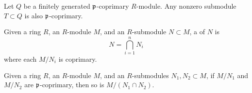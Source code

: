 \documentclass{ximera}
\begin{document}
\begin{lemma}
  Let $Q$ be a finitely generated $\mathfrak{p}$-coprimary $R$-module. Any
  nonzero submodule $T\subset Q$ is also $\mathfrak{p}$-coprimary.
  \begin{sketch}
  \end{sketch}
\end{lemma}




\begin{definition}
  Given a ring $R$, an $R$-module $M$, and an $R$-submodule $N\subset
  M$, a  of $N$ is
  \[
  N = \bigcap_{i=1}^n N_i
  \]
  where each $M/N_i$ is coprimary. 
\end{definition}


\begin{lemma}\label{L:intersectcoprimary}
  Given a ring $R$, an $R$-module $M$, and an $R$-submodules $N_1,N_2\subset
  M$, if $M/N_1$ and $M/N_2$ are $\mathfrak{p}$-coprimary, then so is $M/(N_1\cap N_2)$.
\end{lemma}
\end{document}
